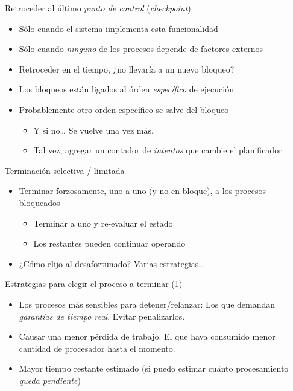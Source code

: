 \documentclass[presentation]{beamer}
\begin{document}
\begin{frame}[label={sec:org581de25}]{Retroceder al último \emph{punto de control} (\emph{checkpoint})}
\begin{itemize}
\item Sólo cuando el sistema implementa esta funcionalidad
\item Sólo cuando \emph{ninguno} de los procesos depende de factores
externos
\item Retroceder en el tiempo, ¿no llevaría a un nuevo bloqueo?\pause
\item Los bloqueos están ligados al órden \emph{específico} de ejecución
\item Probablemente otro orden específico se salve del bloqueo
\begin{itemize}
\item Y si no\ldots{} Se vuelve una vez más.
\item Tal vez, agregar un contador de \emph{intentos} que cambie el planificador
\end{itemize}
\end{itemize}
\end{frame}

\begin{frame}[label={sec:org85e511b}]{Terminación selectiva / limitada}
\begin{itemize}
\item Terminar forzosamente, uno a uno (y no en bloque), a los procesos
bloqueados
\begin{itemize}
\item Terminar a uno y re-evaluar el estado
\item Los restantes pueden continuar operando
\end{itemize}
\item ¿Cómo elijo al desafortunado? Varias estrategias\ldots{}
\end{itemize}
\end{frame}

\begin{frame}[label={sec:orgfdd89f2}]{Estrategias para elegir el proceso a terminar (1)}
\begin{itemize}
\item Los procesos más sensibles para detener/relanzar: Los que
demandan \emph{garantías de tiempo real}. Evitar penalizarlos.
\item Causar una menor pérdida de trabajo. El que haya consumido menor
cantidad de procesador hasta el momento.
\item Mayor tiempo restante estimado (si puedo estimar cuánto
procesamiento \emph{queda pendiente})
\end{itemize}
\end{frame}
\end{document}
